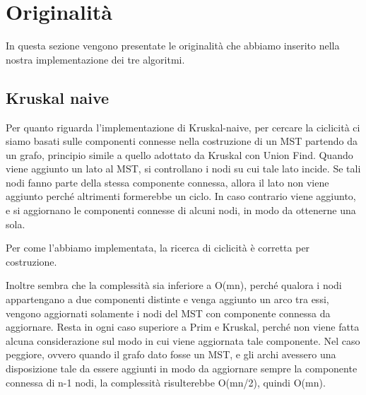 \chapter{Originalità\label{sec:originalita}}
\noindent In questa sezione vengono presentate le originalità che abbiamo inserito nella nostra implementazione dei tre algoritmi.

\section{Kruskal naive\label{sec:originalitanaives}}

Per quanto riguarda l'implementazione di Kruskal-naive, per cercare la ciclicità ci siamo basati sulle componenti connesse nella costruzione di un MST partendo da un grafo, principio simile a quello adottato da Kruskal con Union Find.
Quando viene aggiunto un lato al MST, si controllano i nodi su cui tale lato incide.
Se tali nodi fanno parte della stessa componente connessa, allora il lato non viene aggiunto perché altrimenti formerebbe un ciclo.
In caso contrario viene aggiunto, e si aggiornano le componenti connesse di alcuni nodi, in modo da ottenerne una sola.

Per come l'abbiamo implementata, la ricerca di ciclicità è corretta per costruzione.

Inoltre sembra che la complessità sia inferiore a O(mn), perché qualora i nodi appartengano a due componenti distinte e venga aggiunto un arco tra essi, vengono aggiornati solamente i nodi del MST con componente connessa da aggiornare.
Resta in ogni caso superiore a Prim e Kruskal, perché non viene fatta alcuna considerazione sul modo in cui viene aggiornata tale componente.
Nel caso peggiore, ovvero quando il grafo dato fosse un MST, e gli archi avessero una disposizione tale da essere aggiunti in modo da aggiornare sempre la componente connessa di n-1 nodi, la complessità risulterebbe O(mn/2), quindi O(mn).